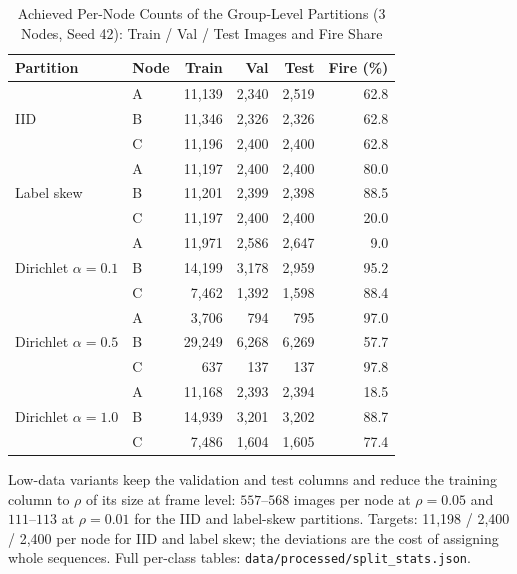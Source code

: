 \documentclass[journal]{IEEEtran}
\begin{document}
\begin{table}[t]
\centering
\caption{Achieved Per-Node Counts of the Group-Level Partitions (3 Nodes, Seed 42): Train / Val / Test Images and Fire Share}
\label{tab:group_counts}
\setlength{\tabcolsep}{3pt}
\begin{tabular}{@{}llrrrr@{}}
\toprule
\textbf{Partition} & \textbf{Node} & \textbf{Train} & \textbf{Val} & \textbf{Test} & \textbf{Fire (\%)} \\
\midrule
\multirow{3}{*}{IID} & A & 11{,}139 & 2{,}340 & 2{,}519 & 62.8 \\
 & B & 11{,}346 & 2{,}326 & 2{,}326 & 62.8 \\
 & C & 11{,}196 & 2{,}400 & 2{,}400 & 62.8 \\
\midrule
\multirow{3}{*}{Label skew} & A & 11{,}197 & 2{,}400 & 2{,}400 & 80.0 \\
 & B & 11{,}201 & 2{,}399 & 2{,}398 & 88.5 \\
 & C & 11{,}197 & 2{,}400 & 2{,}400 & 20.0 \\
\midrule
\multirow{3}{*}{Dirichlet $\alpha=0.1$} & A & 11{,}971 & 2{,}586 & 2{,}647 & 9.0 \\
 & B & 14{,}199 & 3{,}178 & 2{,}959 & 95.2 \\
 & C & 7{,}462 & 1{,}392 & 1{,}598 & 88.4 \\
\midrule
\multirow{3}{*}{Dirichlet $\alpha=0.5$} & A & 3{,}706 & 794 & 795 & 97.0 \\
 & B & 29{,}249 & 6{,}268 & 6{,}269 & 57.7 \\
 & C & 637 & 137 & 137 & 97.8 \\
\midrule
\multirow{3}{*}{Dirichlet $\alpha=1.0$} & A & 11{,}168 & 2{,}393 & 2{,}394 & 18.5 \\
 & B & 14{,}939 & 3{,}201 & 3{,}202 & 88.7 \\
 & C & 7{,}486 & 1{,}604 & 1{,}605 & 77.4 \\
\bottomrule
\end{tabular}
\vspace{2pt}
\footnotesize{Low-data variants keep the validation and test columns and reduce the training column to $\rho$ of its size at frame level: $557$--$568$ images per node at $\rho=0.05$ and $111$--$113$ at $\rho=0.01$ for the IID and label-skew partitions. Targets: 11{,}198 / 2{,}400 / 2{,}400 per node for IID and label skew; the deviations are the cost of assigning whole sequences. Full per-class tables: \texttt{data/processed/split\_stats.json}.}
\end{table}
\end{document}
